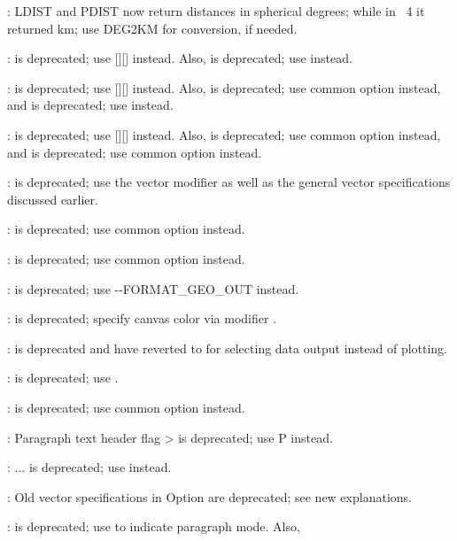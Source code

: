 \begin{enumerate}
{	\item {}: LDIST and PDIST now return distances in spherical degrees; while in \gmt\ 4 it returned km; use DEG2KM for conversion, if needed.
	\item {}:  is deprecated; use [][] instead.
		Also,  is deprecated; use  instead.
	\item {}:  is deprecated; use [][] instead.
		Also,  is deprecated; use common option  instead, and  is deprecated; use  instead.
	\item {}:  is deprecated; use [][] instead.
		Also,  is deprecated; use common option  instead, and  is deprecated; use common option  instead.
	\item {}:  is deprecated; use the vector modifier  as well as the general vector specifications discussed earlier.
	\item {}:  is deprecated; use common option  instead.
	\item {}:  is deprecated; use common option  instead.
	\item {}:  is deprecated; use {-}{-}FORMAT\_GEO\_OUT instead.
	\item {}:  is deprecated; specify canvas color via  modifier .
	\item {}:  is deprecated and have reverted to  for selecting data output instead of plotting.
	\item {}:  is deprecated; use .
	\item {}:  is deprecated; use common option  instead.
	\item {}: Paragraph text header flag > is deprecated; use P instead.
	\item {}: ... is deprecated; use  instead.
	\item {}: Old vector specifications in Option  are deprecated; see new explanations.
	\item {}:  is deprecated; use  to indicate paragraph mode.  Also,
}
\end{enumerate}
